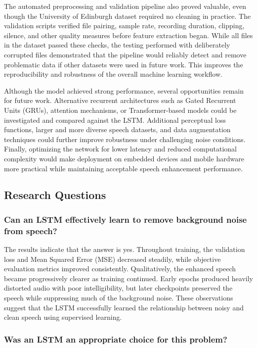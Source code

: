 \documentclass[11pt, letterpaper,titlepage]{article}
\begin{document}
The automated preprocessing and validation pipeline also proved valuable, even though the University of Edinburgh dataset required no cleaning in practice. The validation scripts verified file pairing, sample rate, recording duration, clipping, silence, and other quality measures before feature extraction began. While all files in the dataset passed these checks, the testing performed with deliberately corrupted files demonstrated that the pipeline would reliably detect and remove problematic data if other datasets were used in future work. This improves the reproducibility and robustness of the overall machine learning workflow.

Although the model achieved strong performance, several opportunities remain for future work. Alternative recurrent architectures such as Gated Recurrent Units (GRUs), attention mechanisms, or Transformer-based models could be investigated and compared against the LSTM. Additional perceptual loss functions, larger and more diverse speech datasets, and data augmentation techniques could further improve robustness under challenging noise conditions. Finally, optimizing the network for lower latency and reduced computational complexity would make deployment on embedded devices and mobile hardware more practical while maintaining acceptable speech enhancement performance.


\subsection{Research Questions}



\subsubsection*{Can an LSTM effectively learn to remove background noise from speech?}

The results indicate that the answer is yes. Throughout training, the validation loss and Mean Squared Error (MSE) decreased steadily, while objective evaluation metrics improved consistently. Qualitatively, the enhanced speech became progressively clearer as training continued. Early epochs produced heavily distorted audio with poor intelligibility, but later checkpoints preserved the speech while suppressing much of the background noise. These observations suggest that the LSTM successfully learned the relationship between noisy and clean speech using supervised learning.

\subsubsection*{Was an LSTM an appropriate choice for this problem?}
\end{document}
